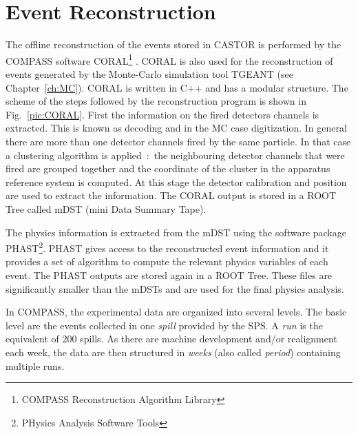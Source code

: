 
\section{Event Reconstruction}

The offline reconstruction of the events stored in CASTOR is performed by the COMPASS software CORAL\footnote{COMPASS Reconstruction Algorithm Library} \cite{NIM}. CORAL is also used for the reconstruction of events generated by the Monte-Carlo simulation tool TGEANT (see Chapter~\ref{ch:MC}). CORAL is written in C++ and has a modular structure. The scheme of the steps followed by the reconstruction program is shown in Fig.~\ref{pic:CORAL}. First the information on the fired detectors channels is extracted. This is known as decoding and in the MC case digitization. In general there are more than one detector channels fired by the same particle. In that case a clustering algorithm is applied~:~the neighbouring detector channels that were fired are grouped together and the coordinate of the cluster in the apparatus reference system is computed. At this stage the detector calibration and position are used to extract the information. The CORAL output is stored in a ROOT Tree called mDST (mini Data Summary Tape).

The physics information is extracted from the mDST using the software package PHAST\footnote{PHysics Analysis Software Tools}. PHAST gives access to the reconstructed event information and it provides a set of algorithm to compute the relevant physics variables of each event. The PHAST outputs are stored again in a ROOT Tree. These files are significantly smaller than the mDSTs and are used for the final physics analysis.

In COMPASS, the experimental data are organized into several levels. The basic level are the events collected in one \textit{spill} provided by the SPS. A \textit{run} is the equivalent of $200$ spills. As there are machine development and/or realignment each week, the data are then structured in \textit{weeks} (also called \textit{period}) containing multiple runs.

